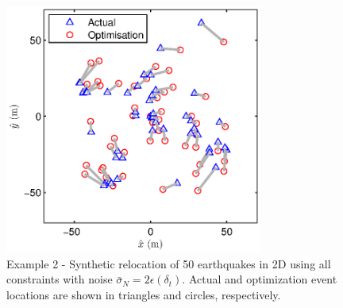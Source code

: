 \documentclass[extra, onecolumn, doublespacing]{gji}
\begin{document}

\begin{figure}
\includegraphics[width = 20pc]{Figure2_c.eps}
\caption{Example 2 - Synthetic relocation of 50 earthquakes in 2D
using all constraints with noise $\bar{\sigma}_N= 2
\epsilon(\delta_t)$.
 Actual and optimization event locations
are shown in triangles and circles, respectively.}
\label{fig-2D50eq-relocation_eg3}
\end{figure}

\end{document}
